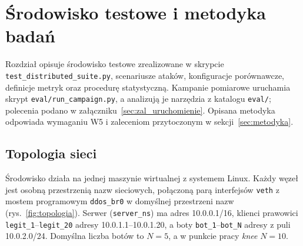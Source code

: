 \documentclass[a4paper,12pt]{article}
\begin{document}
\section{Środowisko testowe i metodyka badań}\label{sec:testbed}
Rozdział opisuje środowisko testowe zrealizowane w skrypcie \texttt{test\_distributed\_suite.py}, scenariusze ataków, konfiguracje porównawcze, definicje metryk oraz procedurę statystyczną. Kampanie pomiarowe uruchamia skrypt \texttt{eval/run\_campaign.py}, a analizują je narzędzia z katalogu \texttt{eval/}; polecenia podano w załączniku~\ref{sec:zal_uruchomienie}. Opisana metodyka odpowiada wymaganiu W5 i zaleceniom przytoczonym w sekcji~\ref{sec:metodyka}.

\subsection{Topologia sieci}\label{sec:topologia}
Środowisko działa na jednej maszynie wirtualnej z systemem Linux. Każdy węzeł jest osobną przestrzenią nazw sieciowych, połączoną parą interfejsów \texttt{veth} z mostem programowym \texttt{ddos\_br0} w domyślnej przestrzeni nazw (rys.~\ref{fig:topologia}). Serwer (\texttt{server\_ns}) ma adres 10.0.0.1/16, klienci prawowici \texttt{legit\_1}--\texttt{legit\_20} adresy 10.0.1.1--10.0.1.20, a boty \texttt{bot\_1}--\texttt{bot\_N} adresy z puli 10.0.2.0/24. Domyślna liczba botów to $N=5$, a w punkcie pracy \textit{knee} $N=10$.
\end{document}
